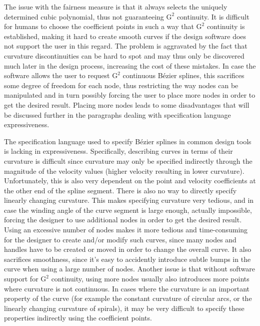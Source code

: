 \documentclass[a4paper]{article}
\begin{document}
				The issue with the fairness measure is that it always selects the uniquely determined cubic polynomial, thus not guaranteeing \(\mathrm{G}^2\) continuity. It is difficult for humans to choose the coefficient points in such a way that \(\mathrm{G}^2\) continuity is established, making it hard to create smooth curves if the design software does not support the user in this regard. The problem is aggravated by the fact that curvature discontinuities can be hard to spot and may thus only be discovered much later in the design process, increasing the cost of these mistakes. In case the software allows the user to request \(\mathrm{G}^2\) continuous Bézier splines, this sacrifices some degree of freedom for each node, thus restricting the way nodes can be manipulated and in turn possibly forcing the user to place more nodes in order to get the desired result. Placing more nodes leads to some disadvantages that will be discussed further in the paragraphs dealing with specification language expressiveness.

				The specification language used to specify Bézier splines in common design tools is lacking in expressiveness. Specifically, describing curves in terms of their curvature is difficult since curvature may only be specified indirectly through the magnitude of the velocity values (higher velocity resulting in lower curvature). Unfortunately, this is also very dependent on the point and velocity coefficients at the other end of the spline segment. There is also no way to directly specify linearly changing curvature. This makes specifying curvature very tedious, and in case the winding angle of the curve segment is large enough, actually impossible, forcing the designer to use additional nodes in order to get the desired result. Using an excessive number of nodes makes it more tedious and time-consuming for the designer to create and/or modify such curves, since many nodes and handles have to be created or moved in order to change the overall curve. It also sacrifices smoothness, since it's easy to accidently introduce subtle bumps in the curve when using a large number of nodes. Another issue is that without software support for \(\mathrm{G}^2\) continuity, using more nodes usually also introduces more points where curvature is not continuous. In cases where the curvature is an important property of the curve (for example the constant curvature of circular arcs, or the linearly changing curvature of spirals), it may be very difficult to specify these properties indirectly using the coefficient points.
\end{document}
